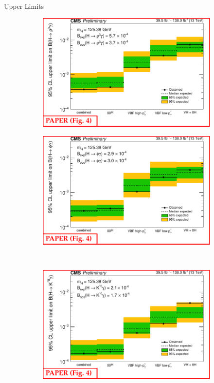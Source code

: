 \documentclass[9pt,aspectratio=1610]{beamer}
\begin{document}
\begin{frame}{Upper Limits}
	\begin{figure}
		\begin{subfigure}{.36\textwidth}
			\centering
			\includegraphics[width=\textwidth]{figures/23-005-v07-marked-figs/fig4-top-right.pdf}
		\end{subfigure}%
		\begin{subfigure}{.36\textwidth}
			\centering
			\includegraphics[width=\textwidth]{figures/23-005-v07-marked-figs/fig4-top-left.pdf}
		\end{subfigure}\\
		\begin{subfigure}{.36\textwidth}
			\centering
			\includegraphics[width=\textwidth]{figures/23-005-v07-marked-figs/fig4-bottom.pdf}

\end{subfigure}
\end{figure}
\end{frame}
\end{document}
